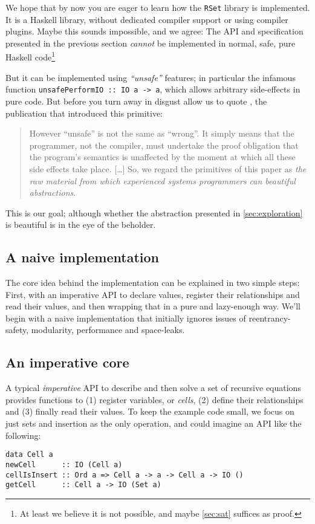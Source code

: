 \documentclass[manuscript,screen,acmsmall]{acmart}
\begin{document}
We hope that by now you are eager to learn how the \verb|RSet| library is implemented. It is a Haskell library, without dedicated compiler support or using compiler plugins. Maybe this sounds impossible, and we agree: The API and specification presented in the previous section \emph{cannot} be implemented in normal, safe, pure Haskell code\footnote{At least we believe it is not possible, and maybe \cref{sec:sat} suffices as proof.}

But it can be implemented using \emph{“unsafe”} features; in particular the infamous function \verb|unsafePerformIO :: IO a -> a|, which allows arbitrary side-effects in pure code. But before you turn away in disgust allow us to quote \citet{unsafePerformIO}, the publication that introduced this primitive:
\begin{quote}
However “unsafe” is not the same as “wrong”. It simply means that the programmer, not the compiler, must undertake the proof obligation that the program's semantics is unaffected by the moment at which all these side effects take place. [\ldots]
So, we regard the primitives of this paper as \emph{the raw material from which experienced systems programmers can beautiful abstractions}.
\end{quote}
This is our goal; although whether the abstraction presented in \cref{sec:exploration} is beautiful is in the eye of the beholder.

\subsection{A naive implementation}

The core idea behind the implementation can be explained in two simple steps: First, with an imperative API to declare values, register their relationships and read their values, and then wrapping that in a pure and lazy-enough way. We’ll begin with a naive implementation that initially ignores issues of reentrancy-safety, modularity, performance and space-leaks.

\subsection{An imperative core}\label{sec:impcore}

A typical \emph{imperative} API to describe and then solve a set of recursive equations provides functions to (1) register variables, or \emph{cells}, (2) define their relationships and (3) finally read their values. To keep the example code small, we focus on just sets and insertion as the only operation, and could imagine an API like the following:
\begin{verbatim}
data Cell a
newCell      :: IO (Cell a)
cellIsInsert :: Ord a => Cell a -> a -> Cell a -> IO ()
getCell      :: Cell a -> IO (Set a)
\end{verbatim}
\end{document}
